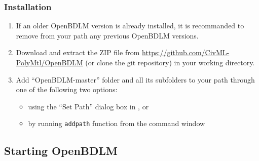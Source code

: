 \subsubsection{Installation}
\begin{enumerate}
\item If an older OpenBDLM version is already installed, it is recommanded to remove from your \MATLAB{} path any previous OpenBDLM versions.
\item Download and extract the ZIP file from \url{https://github.com/CivML-PolyMtl/OpenBDLM} (or clone the git repository) in your working directory.
\item Add ``OpenBDLM-master'' folder and all its subfolders to your \MATLAB{}  path through one of the following two options:
\begin{itemize}
    \item using the ``Set Path'' dialog box in \MATLAB{}, or 
    \item by running  \lstinline[basicstyle = \mlttfamily \small, backgroundcolor = \color{light-gray}]!addpath! function from the \MATLAB{} command window
    \end{itemize}
\end{enumerate}


\subsection{Starting OpenBDLM}
\label{S:OPENBDLMGETTINGSTARTED}

